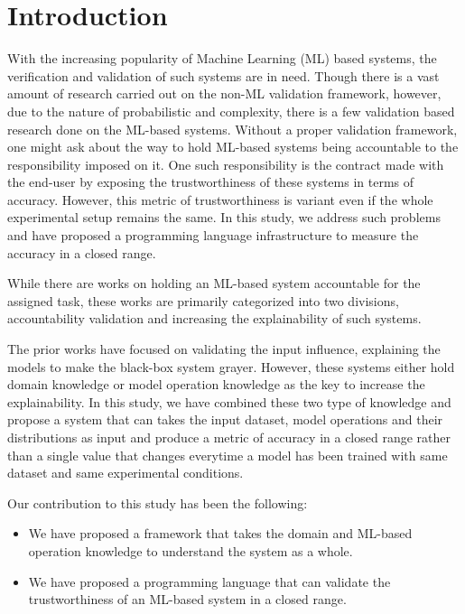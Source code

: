
\section{Introduction}
With the increasing popularity of Machine Learning (ML) based systems, the verification and validation of such systems are in need. Though there is a vast amount of research carried out on the non-ML validation framework, however, due to the nature of probabilistic and complexity, there is a few validation based research done on the ML-based systems. Without a proper validation framework, one might ask about the way to hold ML-based systems being accountable to the responsibility imposed on it. One such responsibility is the contract made with the end-user by exposing the trustworthiness of these systems in terms of accuracy. However, this metric of trustworthiness is variant even if the whole experimental setup remains the same. In this study, we address such problems and have proposed a programming language infrastructure to measure the accuracy in a closed range.


While there are works on holding an ML-based system accountable for the assigned task, these works are primarily categorized into two divisions, accountability validation and increasing the explainability of such systems.

The prior works have focused on validating the input influence, explaining the models to make the black-box system grayer. However, these systems either hold domain knowledge or model operation knowledge as the key to increase the explainability. In this study, we have combined these two type of knowledge and propose a system that can takes the input dataset, model operations and their distributions as input and produce a metric of accuracy in a closed range rather than a single value that changes everytime a model has been trained with same dataset and same experimental conditions.

Our contribution to this study has been the following:
\begin{itemize}
	\item We have proposed a framework that takes the domain and ML-based operation knowledge to understand the system as a whole.
	\item We have proposed a programming language that can validate the trustworthiness of an ML-based system in a closed range.
\end{itemize}


